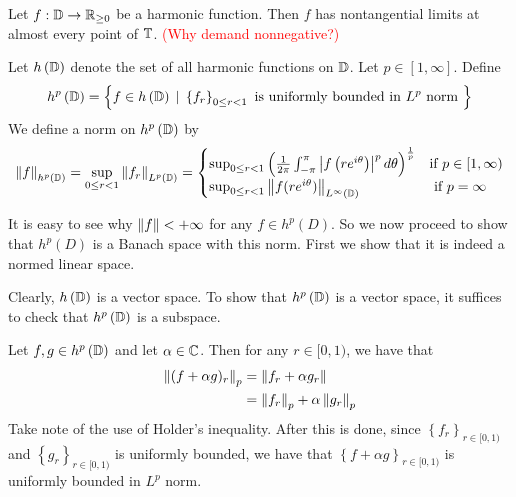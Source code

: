 \begin{corollary}
    Let $f: \mathbb D \to \mathbb R_{\ge 0}$ be a harmonic function. Then $f$ has nontangential limits at almost every point of $\mathbb T$. \textcolor{red}{(Why demand nonnegative?)}
    \label{cor:nontangential-limits}
\end{corollary}

Let $h \left( \mathbb D \right)$ denote the set of all harmonic functions on $\mathbb D$. Let $p\in [1,\infty]$. Define
\begin{equation*}
    h^{p} \left( \mathbb D \right) = \left\{ f\in h \left( \mathbb D \right) \, \mid \, \left\{ f_{r} \right\}_{0\le r < 1} \text{ is uniformly bounded in } L^{p} \text{ norm }\right\}
\end{equation*}
We define a norm on $h^{p} \left( \mathbb D \right)$ by
\begin{equation*}
    \left\lVert f \right\rVert_{h^{p} \left( \mathbb D \right)} = \sup_{0\le r < 1} \left\lVert f_{r} \right\rVert_{L^p \left( \mathbb D \right)} =\begin{cases} \sup_{0\le r < 1} \left( \frac{1}{2\pi} \int_{-\pi}^{\pi} \left\lvert f\left( re^{i\theta}\right) \right\rvert^{p}d\theta   \right)^{\frac{1}{p}} & \text{if } p \in [1, \infty) \\
	\sup_{0\le r < 1} \left\lVert f(re^{i\theta}) \right\rVert_{L^{\infty} \left( \mathbb D \right)} & \text{ if } p=\infty
    \end{cases}
\end{equation*}

It is easy to see why $\left\lVert f \right\rVert < +\infty$ for any $f\in h^{p} \left( D \right)$. So we now proceed to show that $h^{p} \left( D \right)$ is a Banach space with this norm. First we show that it is indeed a normed linear space.

Clearly, $h \left( \mathbb D \right)$ is a vector space. To show that $h^{p} \left( \mathbb D \right)$ is a vector space, it suffices to check that $h^{p} \left( \mathbb D \right)$ is a subspace.

Let $f,g \in h^{p} \left( \mathbb D \right)$ and let $\alpha \in \mathbb C$. Then for any $r\in [0,1)$, we have that 
\begin{align*}
    \left\lVert (f+\alpha g)_{r} \right\rVert_{p} &= \left\lVert f_{r} + \alpha g_{r} \right\rVert \\
    &= \left\lVert f_{r} \right\rVert_{p} + \alpha \left\lVert g_{r} \right\rVert_{p}
\end{align*}
Take note of the use of Holder's inequality. After this is done, since $\left\{ f_{r} \right\}_{r\in [0,1)}$ and $\left\{ g_{r} \right\}_{r\in [0,1)}$ is uniformly bounded, we have that $\left\{ f+ \alpha g \right\}_{r\in [0,1)}$ is uniformly bounded in $L^{p}$ norm.

